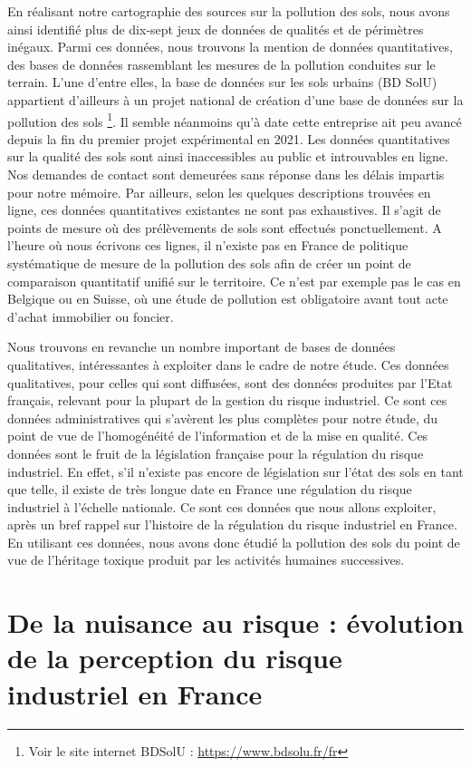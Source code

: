 \documentclass[a4paper,twoside,12pt]{book}
\begin{document}
En réalisant notre cartographie des sources sur la pollution des sols, nous avons ainsi identifié plus de dix-sept jeux de données de qualités et de périmètres inégaux. Parmi ces données, nous trouvons la mention de données quantitatives, des bases de données rassemblant les mesures de la pollution conduites sur le terrain. L'une d'entre elles, la base de données sur les sols urbains (BD SolU) appartient d'ailleurs à un projet national de création d'une base de données sur la pollution des sols \footnote{Voir le site internet BDSolU : \url{https://www.bdsolu.fr/fr}}. Il semble néanmoins qu'à date cette entreprise ait peu avancé depuis la fin du premier projet expérimental en 2021. Les données quantitatives sur la qualité des sols sont ainsi inaccessibles au public et introuvables en ligne. Nos demandes de contact sont demeurées sans réponse dans les délais impartis pour notre mémoire. Par ailleurs, selon les quelques descriptions trouvées en ligne, ces données quantitatives existantes ne sont pas exhaustives. Il s'agit de points de mesure où des prélèvements de sols sont effectués ponctuellement. A l'heure où nous écrivons ces lignes, il n'existe pas en France de politique systématique de mesure de la pollution des sols afin de créer un point de comparaison quantitatif unifié sur le territoire. Ce n'est par exemple pas le cas en Belgique ou en Suisse, où une étude de pollution est obligatoire avant tout acte d'achat immobilier ou foncier.

Nous trouvons en revanche un nombre important de bases de données qualitatives, intéressantes à exploiter dans le cadre de notre étude. Ces données qualitatives, pour celles qui sont diffusées, sont des données produites par l'Etat français, relevant pour la plupart de la gestion du risque industriel. Ce sont ces données administratives qui s'avèrent les plus complètes pour notre étude, du point de vue de l'homogénéité de l'information et de la mise en qualité. Ces données sont le fruit de la législation française pour la régulation du risque industriel. En effet, s'il n'existe pas encore de législation sur l'état des sols en tant que telle, il existe de très longue date en France une régulation du risque industriel à l'échelle nationale. Ce sont ces données que nous allons exploiter, après un bref rappel sur l'histoire de la régulation du risque industriel en France. En utilisant ces données, nous avons donc étudié la pollution des sols du point de vue de l'héritage toxique produit par les activités humaines successives. 

\section[De la nuisance au risque]{De la nuisance au risque : évolution de la perception du risque industriel en France}
\end{document}
